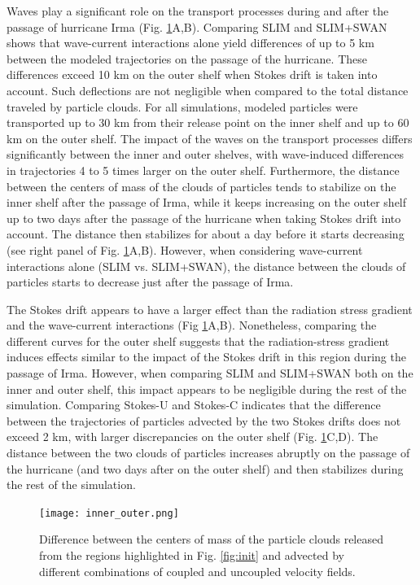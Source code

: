 \documentclass[preprint,12pt,authoryear]{elsarticle}
\begin{document}
Waves play a significant role on the transport processes during and after the passage of hurricane Irma (Fig. \ref{fig:traj}A,B). Comparing SLIM and SLIM+SWAN shows that wave-current interactions alone yield differences of up to 5 km between the modeled trajectories on the passage of the hurricane. These differences exceed 10 km on the outer shelf when Stokes drift is taken into account. Such deflections are not negligible when compared to the total distance traveled by particle clouds. For all simulations, modeled particles were transported up to 30 km from their release point on the inner shelf and up to 60 km on the outer shelf. The impact of the waves on the transport processes differs significantly between the inner and outer shelves, with wave-induced differences in trajectories 4 to 5 times larger on the outer shelf. Furthermore, the distance between the centers of mass of the clouds of particles tends to stabilize on the inner shelf after the passage of Irma, while it keeps increasing on the outer shelf up to two days after the passage of the hurricane when taking Stokes drift into account. The distance then stabilizes for about a day before it starts decreasing (see right panel of Fig. \ref{fig:traj}A,B). However, when considering wave-current interactions alone (SLIM vs. SLIM+SWAN), the distance between the clouds of particles starts to decrease just after the passage of Irma.

The Stokes drift appears to have a larger effect than the radiation stress gradient and the wave-current interactions (Fig \ref{fig:traj}A,B). Nonetheless, comparing the different curves for the outer shelf suggests that the radiation-stress gradient induces effects similar to the impact of the Stokes drift in this region during the passage of Irma. However, when comparing SLIM and SLIM+SWAN both on the inner and outer shelf, this impact appears to be negligible during the rest of the simulation. Comparing Stokes-U and Stokes-C indicates that the difference between the trajectories of particles advected by the two Stokes drifts does not exceed 2 km, with larger discrepancies on the outer shelf (Fig. \ref{fig:traj}C,D). The distance between the two clouds of particles increases abruptly on the passage of the hurricane (and two days after on the outer shelf) and then stabilizes during the rest of the simulation.


\begin{figure}
    \centering
    \texttt{[image: inner\_outer.png]}
    \caption{Difference between the centers of mass of the particle clouds released from the regions highlighted in Fig. \ref{fig:init} and advected by different combinations of coupled and uncoupled velocity fields.}
    \label{fig:traj}
\end{figure}
\end{document}
